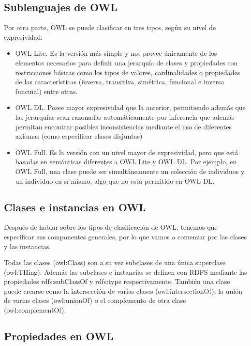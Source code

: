 \subsection{Sublenguajes de OWL}	
Por otra parte, OWL se puede clasificar en tres tipos, según su nivel de expresividad:

\begin{itemize}
	\item OWL Lite. Es la versión más simple y nos provee únicamente de los elementos necesarios para definir una jerarquía de clases y propiedades con restricciones básicas como los tipos de valores, cardinalidades o propiedades de las características (inversa, transitiva, simétrica, funcional e inversa funcinal) entre otras.
	\item OWL DL. Posee mayor expresividad que la anterior, permitiendo además que las jerarquías sean razonadas automáticamente por inferencia que además permitan encontrar posibles inconsistencias mediante el uso de diferentes axiomas (como especificar clases disjuntas)
	\item OWL Full. Es la versión con un nivel mayor de expresividad, pero que está basadas en semánticas diferentes a OWL Lite y OWL DL. Por ejemplo, en OWL Full, una clase puede ser simultáneamente un colección de individuos y un individuo en sí mismo, algo que no está permitido en OWL DL.
\end{itemize}

\subsection{Clases e instancias en OWL}	
Después de hablar sobre los tipos de clasificación de OWL, tenemos que especificar sus componentes generales, por lo que vamos a comenzar por las clases y las instancias.

\bigskip

Todas las clases (owl:Class) son a su vez subclases de una única superclase (owl:THing). Además las subclases e instancias se definen con RDFS mediante las propiedades rdfs:subClassOf y rdfs:type respectivamente. También una clase puede crearse como la intersección de varias clases (owl:intersectionOf), la unión de varias clases (owl:unionOf) o el complemento de otra clase (owl:complementOf).

\subsection{Propiedades en OWL}	

